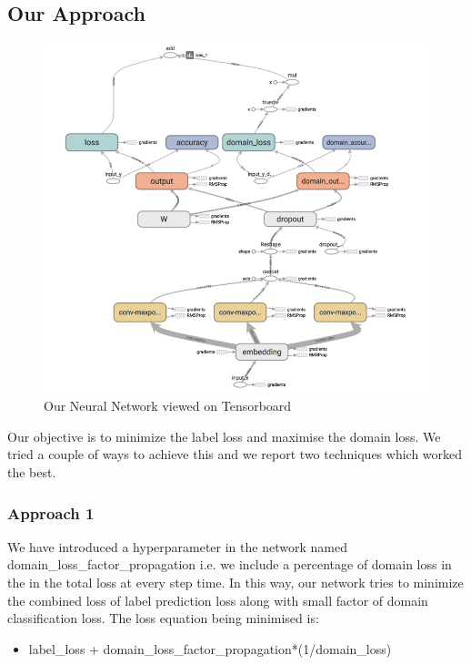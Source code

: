 \documentclass[11pt,a4paper]{article}
\begin{document}
\subsection{Our Approach}
\begin{figure}[htb]
\begin{center}
\includegraphics[width=\columnwidth]{tensorflow_nn.png}
\end{center}
\caption{Our Neural Network viewed on Tensorboard}
\label{fig:figure3}
\end{figure}

Our objective is to minimize the label loss and maximise the domain loss. We tried a couple of ways to achieve this and we report two techniques which worked the best.

\subsubsection{Approach 1}
We have introduced a hyperparameter in the network named domain\_loss\_factor\_propagation i.e. we include a percentage of domain loss in the in the total loss at every step time. In this way, our network tries to minimize the combined loss of label prediction loss along with small factor of domain classification loss. The loss equation being minimised is:
\begin{itemize}
  \item label\_loss + domain\_loss\_factor\_propagation*(1/domain\_loss)
\end{itemize}
\end{document}
